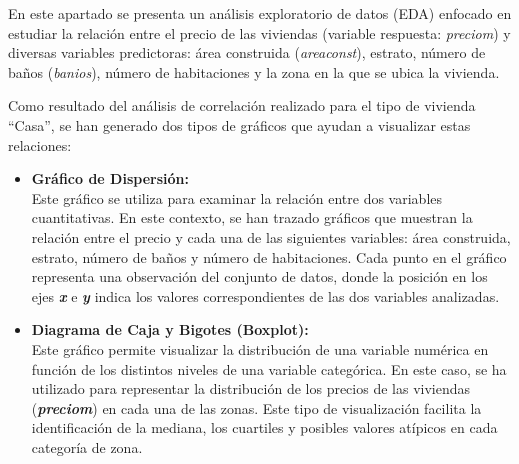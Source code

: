 \documentclass[
]{article}
\begin{document}
En este apartado se presenta un análisis exploratorio de datos (EDA)
enfocado en estudiar la relación entre el precio de las viviendas
(variable respuesta: \emph{preciom}) y diversas variables predictoras:
área construida (\emph{areaconst}), estrato, número de baños
(\emph{banios}), número de habitaciones y la zona en la que se ubica la
vivienda.

Como resultado del análisis de correlación realizado para el tipo de
vivienda ``Casa'', se han generado dos tipos de gráficos que ayudan a
visualizar estas relaciones:

\begin{itemize}
\item
  \textbf{Gráfico de Dispersión:}\\
  Este gráfico se utiliza para examinar la relación entre dos variables
  cuantitativas. En este contexto, se han trazado gráficos que muestran
  la relación entre el precio y cada una de las siguientes variables:
  área construida, estrato, número de baños y número de habitaciones.
  Cada punto en el gráfico representa una observación del conjunto de
  datos, donde la posición en los ejes \textbf{\emph{x}} e
  \textbf{\emph{y}} indica los valores correspondientes de las dos
  variables analizadas.
\item
  \textbf{Diagrama de Caja y Bigotes (Boxplot):}\\
  Este gráfico permite visualizar la distribución de una variable
  numérica en función de los distintos niveles de una variable
  categórica. En este caso, se ha utilizado para representar la
  distribución de los precios de las viviendas (\textbf{\emph{preciom}})
  en cada una de las zonas. Este tipo de visualización facilita la
  identificación de la mediana, los cuartiles y posibles valores
  atípicos en cada categoría de zona.
\end{itemize}
\end{document}
